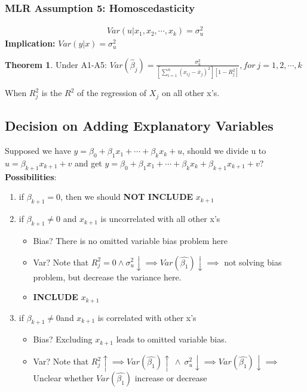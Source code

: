 \documentclass{article}
\theoremstyle{definition}
\theoremstyle{thrm}
\newtheorem{thrm}{Theorem}[section]
\theoremstyle{lma}
\theoremstyle{ppst}
\theoremstyle{crlr}
\begin{document}
\subsubsection{MLR Assumption 5: Homoscedasticity}
\begin{align*}
	Var(u|x_1,x_2,\cdots,x_k) = \sigma_u^2
\end{align*}
\textbf{Implication:} $Var(y|x) = \sigma_u^2$
\begin{thrm}
	Under A1-A5: $Var(\hat{\beta}_j) = \frac{\sigma_u^2}{[\sum_{i=1}^n(x_{ij}-\bar{x}_j)^2][1-R_j^2]}, for \ j = 1,2,\cdots, k$
\end{thrm}
When $R_j^2$ is the $R^2$ of the regression of $X_j$ on all other x's.

\subsection{Decision on Adding Explanatory Variables}
Supposed we have $y = \beta_0+\beta_1x_1+\cdots+\beta_kx_k+u$, should we divide u to $u = \beta_{k+1}x_{k+1} +v$ and get $y = \beta_0+\beta_1x_1+\cdots+\beta_kx_k+\beta_{k+1}x_{k+1} +v$?\\
\textbf{Possibilities}:
\begin{enumerate}
	\item if $\beta_{k+1} = 0$, then we should \textbf{NOT INCLUDE} $x_{k+1}$
	\item if $\beta_{k+1} \neq 0$ and $x_{k+1}$ is uncorrelated with all other x's\begin{itemize}
		\item Bias? There is no omitted variable bias problem here
		\item Var? Note that $R_j^2 = 0 \wedge\sigma_u^2\downarrow \implies Var(\hat{\beta_1})\downarrow \implies$ not solving bias problem, but decrease the variance here. 
		\item \textbf{INCLUDE} $x_{k+1}$
	\end{itemize}
	\item if $\beta_{k+1} \neq 0$and $x_{k+1}$ is correlated with other x's\begin{itemize}
		\item Bias? Excluding $x_{k+1}$ leads to omitted variable bias.
		\item Var? Note that $R_j^2 \uparrow\implies Var(\hat{\beta_1})\uparrow\ \wedge\ \sigma_u^2\downarrow \implies Var(\hat{\beta_1})\downarrow \implies$ Unclear whether $Var(\hat{\beta_1})$ increase or decrease
		\end{itemize}
\end{enumerate}
\end{document}
